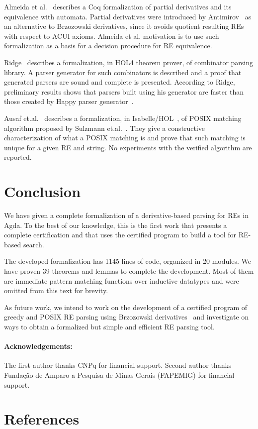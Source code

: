 \documentclass[review]{elsarticle}
\begin{document}
Almeida et al.~\cite{AlmeidaMPS10} describes a Coq formalization of
partial derivatives and its equivalence with automata. Partial
derivatives were introduced by Antimirov~\cite{Antimirov91} as
an alternative to Brzozowski derivatives, since it avoids quotient
resulting REs with respect to ACUI axioms. Almeida et al. motivation
is to use such formalization as a basis for a decision procedure for
RE equivalence.

Ridge~\cite{Ridge2011} describes a formalization, in HOL4 theorem prover, of
combinator parsing library. A parser generator for such combinators is described
and a proof that generated parsers are sound and complete is presented.
According to Ridge, preliminary results shows that parsers built using his
generator are faster than those created by Happy parser generator~\cite{Happy}.

Ausaf et.al.~\cite{AusafDU16} describes a formalization, in Isabelle/HOL~\cite{Nipkow02},
of POSIX matching algorithm proposed by Sulzmann et.al.~\cite{SulzmannL14}. They
give a constructive characterization of what a POSIX matching is and prove that
such matching is unique for a given RE and string. No experiments with the
verified algorithm are reported.


\section{Conclusion}\label{sec:conclusion}

We have given a complete formalization of a derivative-based parsing
for REs in Agda. To the best of our knowledge, this is the first work
that presents a complete certification and that uses the certified
program to build a tool for RE-based search.

The developed formalization has 1145 lines of code, organized in 20
modules. We have proven 39 theorems and lemmas to complete the
development. Most of them are immediate pattern matching functions
over inductive datatypes and were omitted from this text for brevity.

As future work, we intend to work on the development of a certified
program of greedy and POSIX RE parsing using Brzozowski
derivatives~\cite{SulzmannL14,FrischC04} and investigate on
ways to obtain a formalized but simple and efficient RE parsing tool.

\paragraph{Acknowledgements:} The first author thanks CNPq for financial
support. Second author thanks Fundação de Amparo a
Pesquisa de Minas Gerais (FAPEMIG) for financial support.

\section*{References}


\end{document}
